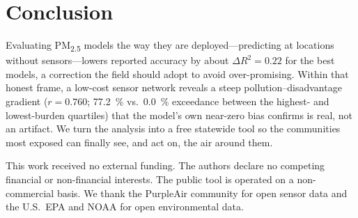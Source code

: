 \documentclass{article}
\begin{document}
\section{Conclusion}
\label{sec:conclusion}

Evaluating PM\textsubscript{2.5} models the way they are deployed---predicting at locations without sensors---lowers reported accuracy by about $\Delta R^2{=}0.22$ for the best models, a correction the field should adopt to avoid over-promising. Within that honest frame, a low-cost sensor network reveals a steep pollution--disadvantage gradient ($r{=}0.760$; \SI{77.2}{\percent} vs.\ \SI{0.0}{\percent} exceedance between the highest- and lowest-burden quartiles) that the model's own near-zero bias confirms is real, not an artifact. We turn the analysis into a free statewide tool so the communities most exposed can finally see, and act on, the air around them.

\begin{ack}
This work received no external funding. The authors declare no competing financial or non-financial interests. The public tool is operated on a non-commercial basis. We thank the PurpleAir community for open sensor data and the U.S.\ EPA and NOAA for open environmental data.
\end{ack}

\small


\end{document}

